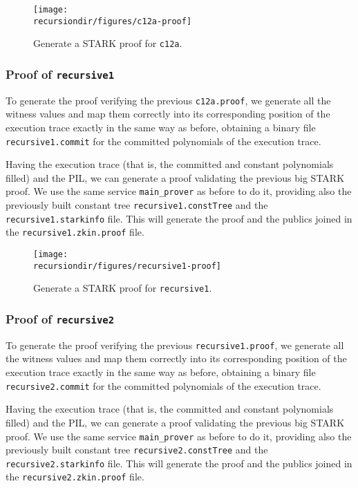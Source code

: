 \begin{figure}[H]
\centering
\texttt{[image: \\recursiondir/figures/c12a-proof]}
\caption{Generate a STARK proof for \texttt{c12a}.}
\label{fig:c12a-proof}
\end{figure}



\subsubsection{Proof of \texttt{recursive1}}

To generate the proof verifying the previous \texttt{c12a.proof}, we generate all the witness values and map them correctly into its corresponding position of the execution trace exactly in the same way as before, obtaining a binary file \texttt{recursive1.commit} for the committed polynomials of the execution trace. 

Having the execution trace (that is, the committed and constant polynomials filled) and the PIL, we can generate a proof validating the previous big STARK proof. We use the same service \texttt{main\_prover} as before to do it, providing also the previously built constant tree \texttt{recursive1.constTree} and the \texttt{recursive1.starkinfo} file. This will generate the proof and the publics joined in the \texttt{recursive1.zkin.proof} file. 

\begin{figure}[H]
\centering
\texttt{[image: \\recursiondir/figures/recursive1-proof]}
\caption{Generate a STARK proof for \texttt{recursive1}.}
\label{fig:recursive1-proof}
\end{figure}



\subsubsection{Proof of \texttt{recursive2}}

To generate the proof verifying the previous \texttt{recursive1.proof}, we generate all the witness values and map them correctly into its corresponding position of the execution trace exactly in the same way as before, obtaining a binary file \texttt{recursive2.commit} for the committed polynomials of the execution trace. 

Having the execution trace (that is, the committed and constant polynomials filled) and the PIL, we can generate a proof validating the previous big STARK proof. We use the same service \texttt{main\_prover} as before to do it, providing also the previously built constant tree \texttt{recursive2.constTree} and the \texttt{recursive2.starkinfo} file. This will generate the proof and the publics joined in the \texttt{recursive2.zkin.proof} file. 

